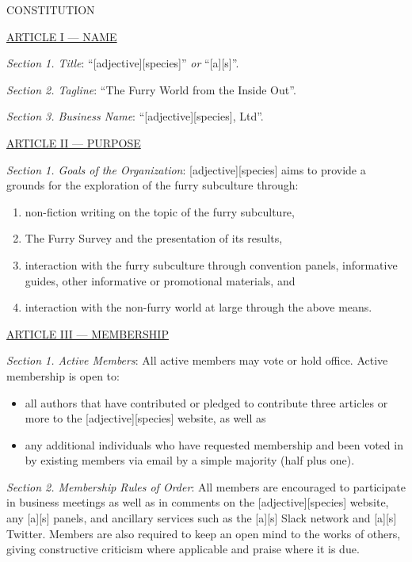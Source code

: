 \documentclass{article}
\begin{document}
\begin{center}
\Huge{CONSTITUTION}
\end{center}

\bigskip

\large{\underline{ARTICLE I --- NAME}}

\emph{Section 1. Title}: ``[adjective][species]'' \emph{or} ``[a][s]''.

\emph{Section 2. Tagline}: ``The Furry World from the Inside Out''.

\emph{Section 3. Business Name}: ``[adjective][species], Ltd''.

\bigskip

\large{\underline{ARTICLE II --- PURPOSE}}

\emph{Section 1. Goals of the Organization}: [adjective][species] aims to provide a grounds for the exploration of the furry subculture through:
\begin{enumerate}
  \item non-fiction writing on the topic of the furry subculture,
  \item The Furry Survey and the presentation of its results,
  \item interaction with the furry subculture through convention panels, informative guides, other informative or promotional materials, and
  \item interaction with the non-furry world at large through the above means.
\end{enumerate}

\bigskip

\large{\underline{ARTICLE III --- MEMBERSHIP}}

\emph{Section 1. Active Members}: All active members may vote or hold office.  Active membership is open to:
\begin{itemize}
  \item all authors that have contributed or pledged to contribute three articles or more to the [adjective][species] website, as well as
  \item any additional individuals who have requested membership and been voted in by existing members via email by a simple majority (half plus one).
\end{itemize}

\emph{Section 2. Membership Rules of Order}: All members are encouraged to participate in business meetings as well as in comments on the [adjective][species] website, any [a][s] panels, and ancillary services such as the [a][s] Slack network and [a][s] Twitter.  Members are also required to keep an open mind to the works of others, giving constructive criticism where applicable and praise where it is due.
\end{document}
